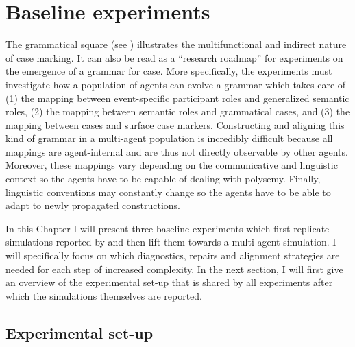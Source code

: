 
\setcounter{chapter}{2}
\chapter{Baseline experiments}
\label{c:base}

The grammatical square (see ) illustrates the multifunctional and indirect nature of case marking. It can also be read as a ``research roadmap'' for experiments on the emergence of a grammar for case. More specifically, the experiments must investigate how a population of agents can evolve a grammar which takes care of (1) the mapping between event-specific participant roles and generalized semantic roles, (2) the mapping between semantic roles and grammatical cases, and (3) the mapping between cases and surface case markers. Constructing and aligning this kind of grammar in a multi-agent population is incredibly difficult because all mappings are agent-internal and are thus not directly observable by other agents. Moreover, these mappings vary depending on the communicative and linguistic context so the agents have to be capable of dealing with polysemy. Finally, linguistic conventions may constantly change so the agents have to be able to adapt to newly propagated constructions.

In this Chapter I will present three baseline experiments which first replicate simulations reported by \citet{steels02simulating, steels04constructivist} and then lift them towards a multi-agent simulation. I will specifically focus on which diagnostics, repairs and alignment strategies are needed for each step of increased complexity. In the next section, I will first give an overview of the experimental set-up that is shared by all experiments after which the simulations themselves are reported.

\section{Experimental set-up}

